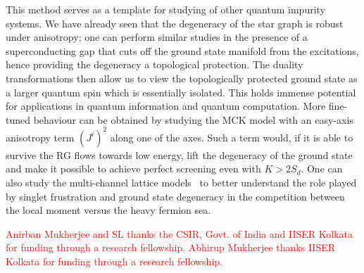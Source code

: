 \documentclass[reprint,prb,superscriptaddress]{revtex4-2}
\begin{document}
\par This method serves as a template for studying of other quantum impurity systems.
We have already seen that the degeneracy of the star graph is robust under anisotropy; one can perform similar studies in the presence of a superconducting gap that cuts off the ground state manifold from the excitations, hence providing the degeneracy a topological protection.
The duality transformations then allow us to view the topologically protected ground state as a larger quantum spin which is essentially isolated.
This holds immense potential for applications in quantum information and quantum computation.
More fine-tuned behaviour can be obtained by studying the MCK model with an easy-axis anisotropy term \(\left(J^i\right)^2\) along one of the axes.
Such a term would, if it is able to survive the RG flows towards low energy, lift the degeneracy of the ground state and make it possible to achieve perfect screening even with \(K > 2S_d\).
One can also study the multi-channel lattice models~\cite{Piguet1997,shaw_1998} to better understand the role played by singlet frustration and ground state degeneracy in the competition between the local moment versus the heavy fermion sea.

\acknowledgments
\textcolor{red}{Anirban Mukherjee and SL thanks the CSIR, Govt. of India and IISER Kolkata for funding through a research fellowship. Abhirup Mukherjee thanks IISER Kolkata for funding through a research fellowship.}


\end{document}
